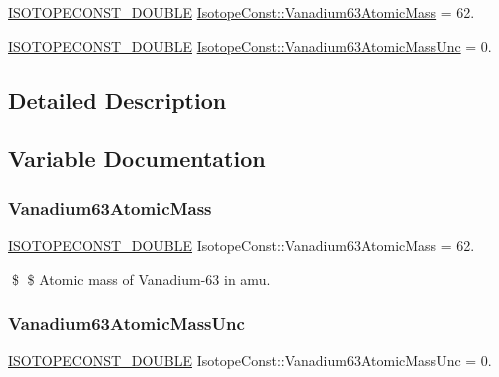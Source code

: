 \begin{DoxyCompactItemize}
\item 
\mbox{\hyperlink{group___isotope_const-_macros_ga8f45a7272ce02c0b4c65c44636ed719a}{I\+S\+O\+T\+O\+P\+E\+C\+O\+N\+S\+T\+\_\+\+D\+O\+U\+B\+LE}} \mbox{\hyperlink{group___isotope_const-_vanadium-_v63_ga2b4a8c581c426c483efb9e962e526a67}{Isotope\+Const\+::\+Vanadium63\+Atomic\+Mass}} = 62.
\item 
\mbox{\hyperlink{group___isotope_const-_macros_ga8f45a7272ce02c0b4c65c44636ed719a}{I\+S\+O\+T\+O\+P\+E\+C\+O\+N\+S\+T\+\_\+\+D\+O\+U\+B\+LE}} \mbox{\hyperlink{group___isotope_const-_vanadium-_v63_gacb8c5bd4d8b6e319d5ba3710b5991ace}{Isotope\+Const\+::\+Vanadium63\+Atomic\+Mass\+Unc}} = 0.
\end{DoxyCompactItemize}


\subsection{Detailed Description}


\subsection{Variable Documentation}
\mbox{\label{group___isotope_const-_vanadium-_v63_ga2b4a8c581c426c483efb9e962e526a67}} 
\subsubsection{\texorpdfstring{Vanadium63\+Atomic\+Mass}{Vanadium63AtomicMass}}
{\footnotesize\ttfamily \mbox{\hyperlink{group___isotope_const-_macros_ga8f45a7272ce02c0b4c65c44636ed719a}{I\+S\+O\+T\+O\+P\+E\+C\+O\+N\+S\+T\+\_\+\+D\+O\+U\+B\+LE}} Isotope\+Const\+::\+Vanadium63\+Atomic\+Mass = 62.}

\$ \$ Atomic mass of Vanadium-\/63 in amu. \mbox{\label{group___isotope_const-_vanadium-_v63_gacb8c5bd4d8b6e319d5ba3710b5991ace}} 
\subsubsection{\texorpdfstring{Vanadium63\+Atomic\+Mass\+Unc}{Vanadium63AtomicMassUnc}}
{\footnotesize\ttfamily \mbox{\hyperlink{group___isotope_const-_macros_ga8f45a7272ce02c0b4c65c44636ed719a}{I\+S\+O\+T\+O\+P\+E\+C\+O\+N\+S\+T\+\_\+\+D\+O\+U\+B\+LE}} Isotope\+Const\+::\+Vanadium63\+Atomic\+Mass\+Unc = 0.}

